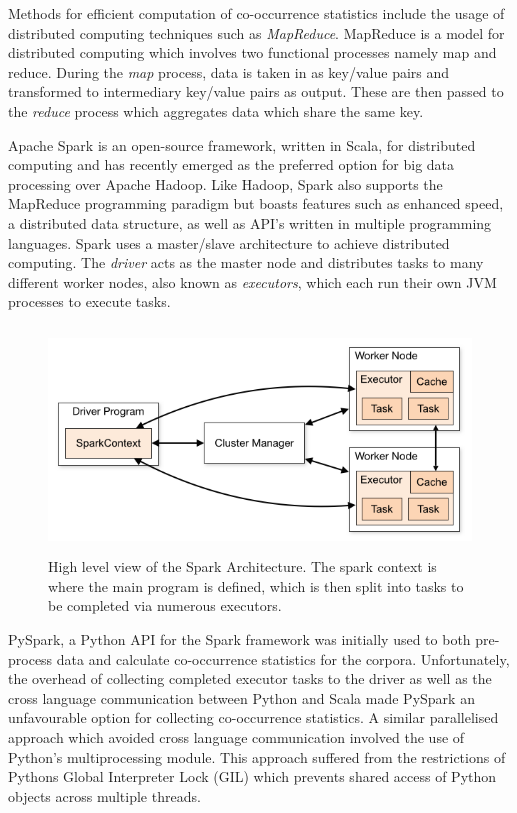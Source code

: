 \noindent
\newline
Methods for efficient computation of co-occurrence statistics include the usage of distributed computing techniques such as \textit{MapReduce}. MapReduce is a model for distributed computing which involves two functional processes namely map and reduce. During the \textit{map} process, data is taken in as key/value pairs and transformed to intermediary key/value pairs as output. These are then passed to the \textit{reduce} process which aggregates data which share the same key.

\noindent
\newline
Apache Spark is an open-source framework, written in Scala, for distributed computing and has recently emerged as the preferred option for big data processing over Apache Hadoop. Like Hadoop, Spark also supports the MapReduce programming paradigm but boasts features such as enhanced speed, a distributed data structure, as well as API's written in multiple programming languages. Spark uses a master/slave architecture to achieve distributed computing. The \textit{driver} acts as the master node and distributes tasks to many different worker nodes, also known as \textit{executors}, which each run their own JVM processes to execute tasks.

\begin{figure}[h]
	\includegraphics[width=12cm, height=6cm]{./figures/fig5}
	\centering
	\caption{High level view of the Spark Architecture. The spark context is where the main program is defined, which is then split into tasks to be completed via numerous executors.}
	\label{fig:fig5}
\end{figure}

\noindent
\newline
PySpark, a Python API for the Spark framework was initially used to both pre-process data and calculate co-occurrence statistics for the corpora. 
Unfortunately, the overhead of collecting completed executor tasks to the driver as well as the cross language communication between Python and Scala made PySpark an unfavourable option for collecting co-occurrence statistics. A similar parallelised approach which avoided cross language communication involved the use of Python's multiprocessing module. This approach suffered from the restrictions of Pythons Global Interpreter Lock (GIL) which prevents shared access of Python objects across multiple threads. 

